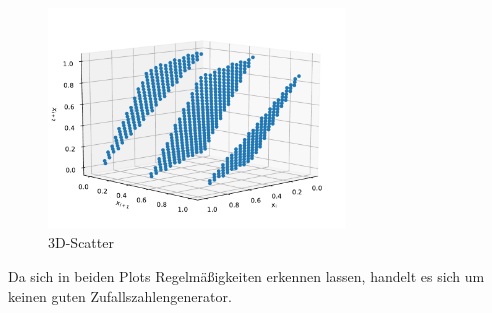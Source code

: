 \begin{figure}[H]
  \centering
  \includegraphics[width=0.7\textwidth]{Aufgabe06/Teilaufgabe_c)_3D-Scatter.pdf}
  \caption{3D-Scatter}
  \label{fig:3dscatterd}
\end{figure}
Da sich in beiden Plots Regelmäßigkeiten erkennen lassen, handelt es sich um keinen guten Zufallszahlengenerator.

